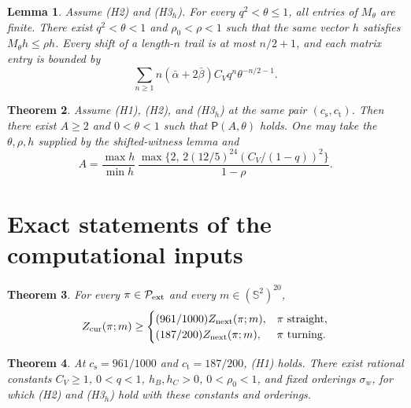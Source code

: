 \documentclass[11pt,reqno]{amsart}
\newtheorem{theorem}{Theorem}[section]
\newtheorem{lemma}[theorem]{Lemma}
\theoremstyle{definition}
\theoremstyle{remark}
\begin{document}
\begin{lemma}\label{l:Mtheta}
Assume (H2) and (H3\( _h\)).
For every \(q^2<\theta\le1\), all entries of \(M_\theta\) are
finite. There exist \(q^2<\theta<1\) and \(\rho_0<\rho<1\)
such that the same vector \(h\) satisfies \(M_\theta h\le\rho h\).
Every shift of a length-\(n\) trail is at most \(n/2+1\), and
each matrix entry is bounded by
\[
 \sum_{n\ge1} n(\bar\alpha+2\bar\beta)
                      C_V q^n\theta^{-n/2-1}.
\]
\end{lemma}

\begin{theorem}\label{t:rec}
Assume (H1), (H2), and (H3\( _h\)) at the same pair
\((c_{\mathrm s},c_{\mathrm t})\).
Then there exist \(A\ge2\) and \(0<\theta<1\) such that
\(\mathsf P(A,\theta)\) holds.
One may take the \(\theta,\rho,h\) supplied by the shifted-witness
lemma and
\[
 A=\frac{\max h}{\min h}\,
       \frac{\max\{2,\,2(12/5)^{24}(C_V/(1-q))^2\}}{1-\rho}.
\]
\end{theorem}


\section{Exact statements of the computational inputs}

\begin{theorem}\label{t:H1}
For every \(\pi\in\mathcal P_{\rm ext}\) and every
\(m\in(\mathbb S^2)^{20}\),
\[
 Z_{\rm cur}(\pi;m)\ge
 \begin{cases}
 (961/1000)Z_{\rm next}(\pi;m),&\pi\text{ straight},\\
 (187/200)Z_{\rm next}(\pi;m),&\pi\text{ turning}.
 \end{cases}
\]
\end{theorem}

\begin{theorem}\label{t:inputs}
At \(c_{\mathrm s}=961/1000\) and \(c_{\mathrm t}=187/200\),
(H1) holds. There exist rational constants
\(C_V\ge1\), \(0<q<1\), \(h_B,h_C>0\), \(0<\rho_0<1\),
and fixed orderings \(\sigma_w\), for which (H2) and
(H3\( _h\)) hold with these constants and orderings.
\end{theorem}
\end{document}
